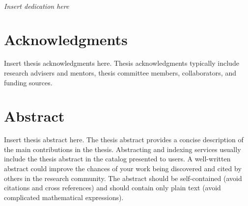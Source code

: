 \begingroup
\centering
{}
~
\\[1in]
\textit{Insert dedication here}
\par
\endgroup

\clearpage


\chapter*{Acknowledgments}

{\color{red}%
Insert thesis acknowledgments here.
Thesis acknowledgments typically include research advisers and mentors, thesis committee members, collaborators, and funding sources.}

\lipsum[1-2]

\clearpage


\chapter*{Abstract}

{\color{red}%
Insert thesis abstract here.
The thesis abstract provides a concise description of the main contributions in the thesis.
Abstracting and indexing services usually include the thesis abstract in the catalog presented to users.
A well-written abstract could improve the chances of your work being discovered and cited by others in the research community.
The abstract should be self-contained (avoid citations and cross references) and should contain only plain text (avoid complicated mathematical expressions).}

\lipsum[1-6]

\clearpage


\tableofcontents

\listoffigures

\listoftables

\clearpage

